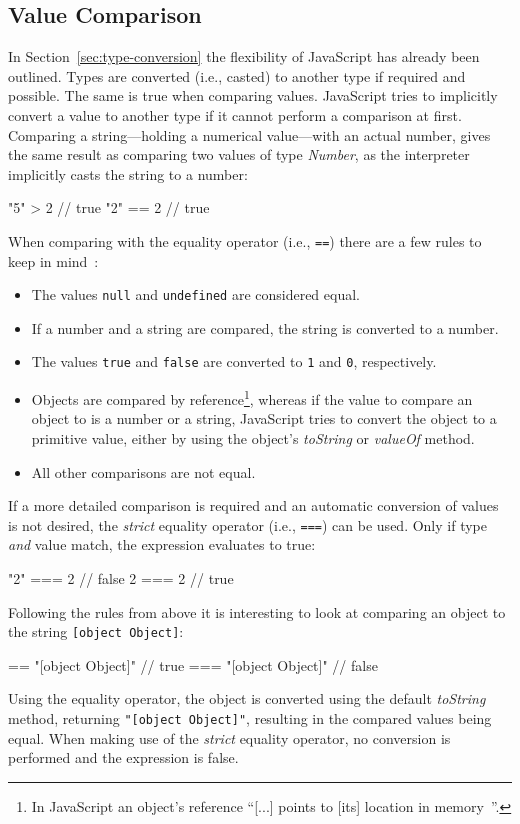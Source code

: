 \subsection{Value Comparison}
\label{sec:value-comparison}

In Section~\ref{sec:type-conversion} the flexibility of JavaScript has already been outlined. Types are converted (i.e., casted) to another type if required and possible.  The same is true when comparing values. JavaScript tries to implicitly convert a value to another type if it cannot perform a comparison at first. Comparing a string---holding a numerical value---with an actual number, gives the same result as comparing two values of type \emph{Number}, as the interpreter implicitly casts the string to a number:
\begin{JsCode}[numbers=none]
"5" > 2 // true
"2" == 2 // true
\end{JsCode}
When comparing with the equality operator (i.e., \texttt{==}) there are a few rules to keep in mind~\cite[p.~72]{JavaScriptTheDefinitiveGuide:Flanagan:2011}:
\begin{itemize}
  \item The values \texttt{null} and \texttt{undefined} are considered equal.
  \item If a number and a string are compared, the string is converted to a number.
  \item The values \texttt{true} and \texttt{false} are converted to \texttt{1} and \texttt{0}, respectively.
  \item Objects are compared by reference\footnote{In JavaScript an object's reference ``[...] points to [its] location in memory~\cite{ByValueByReference:Aggarwal:2017}''.}, whereas if the value to compare an object to is a number or a string, JavaScript tries to convert the object to a primitive value, either by using the object's \emph{toString} or \emph{valueOf} method.
  \item All other comparisons are not equal.
\end{itemize}
If a more detailed comparison is required and an automatic conversion of values is not desired, the \emph{strict} equality operator (i.e., \texttt{===}) can be used. Only if type \emph{and} value match, the expression evaluates to true:
\begin{JsCode}[numbers=none]
"2" === 2 // false
2 === 2   // true
\end{JsCode}
Following the rules from above it is interesting to look at comparing an object to the string \texttt{[object Object]}:
\begin{JsCode}[numbers=none]
{} == "[object Object]"  // true
{} === "[object Object]" // false
\end{JsCode}
Using the equality operator, the object is converted using the default \emph{toString} method, returning \texttt{"[object Object]"}, resulting in the compared values being equal. When making use of the \emph{strict} equality operator, no conversion is performed and the expression is false.

